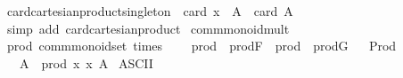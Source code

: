 \begin{isabellebody}
\endisatagproof
{\isafoldproof}%
%
\isadelimproof
\isanewline
%
\endisadelimproof
\isanewline
{}\isamarkupfalse%
\ card{\isacharunderscore}{\kern0pt}cartesian{\isacharunderscore}{\kern0pt}product{\isacharunderscore}{\kern0pt}singleton{\isacharcolon}{\kern0pt}\ \ {\isachardoublequoteopen}card\ {\isacharparenleft}{\kern0pt}{\isacharbraceleft}{\kern0pt}x{\isacharbraceright}{\kern0pt}\ {\isasymtimes}\ A{\isacharparenright}{\kern0pt}\ {\isacharequal}{\kern0pt}\ card\ A{\isachardoublequoteclose}\isanewline
%
\isadelimproof
\ \ %
\endisadelimproof
%
\isatagproof
{}\isamarkupfalse%
\ {\isacharparenleft}{\kern0pt}simp\ add{\isacharcolon}{\kern0pt}\ card{\isacharunderscore}{\kern0pt}cartesian{\isacharunderscore}{\kern0pt}product{\isacharparenright}{\kern0pt}%
\endisatagproof
{\isafoldproof}%
%
\isadelimproof
%
\endisadelimproof
%
\isadelimdocument
%
\endisadelimdocument
%
\isatagdocument
%
\isamarkuptrue%
%
\endisatagdocument
{\isafolddocument}%
%
\isadelimdocument
%
\endisadelimdocument
{}\isamarkupfalse%
\ comm{\isacharunderscore}{\kern0pt}monoid{\isacharunderscore}{\kern0pt}mult\isanewline
{}\isanewline
\isanewline
{}\isamarkupfalse%
\ prod{\isacharcolon}{\kern0pt}\ comm{\isacharunderscore}{\kern0pt}monoid{\isacharunderscore}{\kern0pt}set\ times\ {}\isanewline
\ \ \ prod\ {\isacharequal}{\kern0pt}\ prod{\isachardot}{\kern0pt}F\ \ prod{\isacharprime}{\kern0pt}\ {\isacharequal}{\kern0pt}\ prod{\isachardot}{\kern0pt}G%
\isadelimproof
\ %
\endisadelimproof
%
\isatagproof
\isacommand{{\isachardot}{\kern0pt}{\isachardot}{\kern0pt}}\isamarkupfalse%
%
\endisatagproof
{\isafoldproof}%
%
\isadelimproof
%
\endisadelimproof
\isanewline
\isanewline
{}\isamarkupfalse%
\ Prod\ {\isacharparenleft}{\kern0pt}{\isachardoublequoteopen}{\isasymProd}{\isacharunderscore}{\kern0pt}{\isachardoublequoteclose}\ {\isacharbrackleft}{\kern0pt}{}{}{}{}{\isacharbrackright}{\kern0pt}\ {}{}{}{\isacharparenright}{\kern0pt}\isanewline
\ \ \ {\isachardoublequoteopen}{\isasymProd}A\ {\isasymequiv}\ prod\ {\isacharparenleft}{\kern0pt}{\isasymlambda}x{\isachardot}{\kern0pt}\ x{\isacharparenright}{\kern0pt}\ A{\isachardoublequoteclose}\isanewline
\isanewline
{}\isamarkupfalse%
\isanewline
\isanewline
{}\isamarkupfalse%
\ {\isacharparenleft}{\kern0pt}ASCII{\isacharparenright}{\kern0pt}\isanewline

\end{isabellebody}
